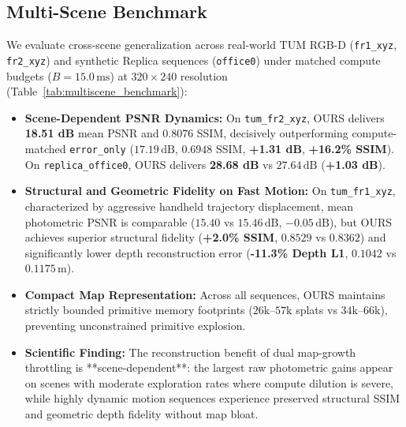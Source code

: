 \documentclass[10pt,twocolumn,letterpaper]{article}
\begin{document}
\subsection{Multi-Scene Benchmark}
We evaluate cross-scene generalization across real-world TUM RGB-D (\texttt{fr1\_xyz}, \texttt{fr2\_xyz}) and synthetic Replica sequences (\texttt{office0}) under matched compute budgets ($B=15.0\,\mathrm{ms}$) at $320\times 240$ resolution (Table~\ref{tab:multiscene_benchmark}):
\begin{itemize}
\setlength{\itemsep}{1pt}
\item \textbf{Scene-Dependent PSNR Dynamics:} On \texttt{tum\_fr2\_xyz}, OURS delivers \textbf{18.51 dB} mean PSNR and $0.8076$ SSIM, decisively outperforming compute-matched \texttt{error\_only} ($17.19\,\mathrm{dB}$, $0.6948$ SSIM, \textbf{+1.31 dB}, \textbf{+16.2\% SSIM}). On \texttt{replica\_office0}, OURS delivers \textbf{28.68 dB} vs $27.64\,\mathrm{dB}$ (\textbf{+1.03 dB}).
\item \textbf{Structural and Geometric Fidelity on Fast Motion:} On \texttt{tum\_fr1\_xyz}, characterized by aggressive handheld trajectory displacement, mean photometric PSNR is comparable ($15.40$ vs $15.46\,\mathrm{dB}$, $-0.05\,\mathrm{dB}$), but OURS achieves superior structural fidelity (\textbf{+2.0\% SSIM}, $0.8529$ vs $0.8362$) and significantly lower depth reconstruction error (\textbf{-11.3\% Depth L1}, $0.1042$ vs $0.1175\,\mathrm{m}$).
\item \textbf{Compact Map Representation:} Across all sequences, OURS maintains strictly bounded primitive memory footprints ($26\mathrm{k}\text{--}57\mathrm{k}$ splats vs $34\mathrm{k}\text{--}66\mathrm{k}$), preventing unconstrained primitive explosion.
\item \textbf{Scientific Finding:} The reconstruction benefit of dual map-growth throttling is **scene-dependent**: the largest raw photometric gains appear on scenes with moderate exploration rates where compute dilution is severe, while highly dynamic motion sequences experience preserved structural SSIM and geometric depth fidelity without map bloat.
\end{itemize}
\end{document}
